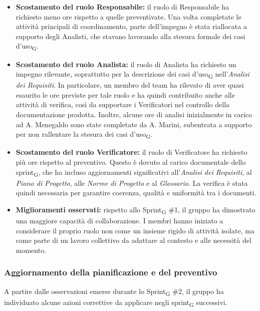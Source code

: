 ﻿\documentclass[a4paper, 10pt, colorlinks=true, linkcolor=black, urlcolor=blue, citecolor=blue, hidelinks]{article}
\begin{document}
\begin{itemize}
    \item \textbf{Scostamento del ruolo Responsabile:}
    il ruolo di Responsabile ha richiesto meno ore rispetto a quelle preventivate. Una volta completate le attività principali di coordinamento, parte dell'impegno è stata riallocata a supporto degli Analisti, che stavano lavorando alla stesura formale dei casi d'uso\textsubscript{G}.

    \item \textbf{Scostamento del ruolo Analista:}
    il ruolo di Analista ha richiesto un impegno rilevante, soprattutto per la descrizione dei casi d'uso\textsubscript{G} nell'\textit{Analisi dei Requisiti}. In particolare, un membro del team ha rilevato di aver quasi esaurito le ore previste per tale ruolo e ha quindi contribuito anche alle attività di verifica, così da supportare i Verificatori nel controllo della documentazione prodotta. Inoltre, alcune ore di analisi inizialmente in carico ad A. Menegaldo sono state completate da A. Marini, subentrata a supporto per non rallentare la stesura dei casi d'uso\textsubscript{G}.

    \item \textbf{Scostamento del ruolo Verificatore:}
    il ruolo di Verificatore ha richiesto più ore rispetto al preventivo. Questo è dovuto al carico documentale dello sprint\textsubscript{G}, che ha incluso aggiornamenti significativi all'\textit{Analisi dei Requisiti}, al \textit{Piano di Progetto}, alle \textit{Norme di Progetto} e al \textit{Glossario}. La verifica è stata quindi necessaria per garantire coerenza, qualità e uniformità tra i documenti.

    \item \textbf{Miglioramenti osservati:}
    rispetto allo Sprint\textsubscript{G} \#1, il gruppo ha dimostrato una maggiore capacità di collaborazione. I membri hanno iniziato a considerare il proprio ruolo non come un insieme rigido di attività isolate, ma come parte di un lavoro collettivo da adattare al contesto e alle necessità del momento.
\end{itemize}

\subsubsection{Aggiornamento della pianificazione e del preventivo}
A partire dalle osservazioni emerse durante lo Sprint\textsubscript{G} \#2, il gruppo ha individuato alcune azioni correttive da applicare negli sprint\textsubscript{G} successivi.
\end{document}

